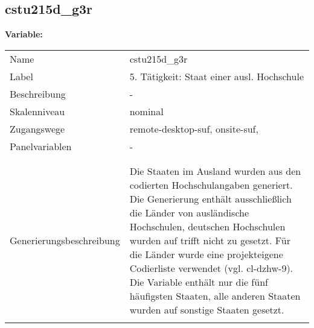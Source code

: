 	
	
	\subsection{cstu215d\_g3r}
	\label{subSection:cstu215d_g3r}

	\noindent\textbf{Variable:}\\
		\begin{tabular}{lL{11.3cm}}
			\label{tableVariable:cstu215d_g3r}
			Name & cstu215d\_g3r \\
			Label & 5. Tätigkeit: Staat einer ausl. Hochschule \\
			Beschreibung & - \\
			Skalenniveau & nominal \\
			Zugangswege &
				remote-desktop-suf,
				onsite-suf,
 \\
			Panelvariablen & -
			 \\
			 \\
 \\
					Generierungsbeschreibung & Die Staaten im Ausland wurden aus den codierten Hochschulangaben generiert. Die Generierung enthält ausschließlich die Länder von ausländische Hochschulen, deutschen Hochschulen wurden auf trifft nicht zu gesetzt. Für die Länder wurde eine projekteigene Codierliste verwendet (vgl. cl-dzhw-9). Die Variable enthält nur die fünf häufigsten Staaten, alle anderen Staaten wurden auf sonstige Staaten gesetzt. 
				 \\	
			 \\
		\end{tabular}






